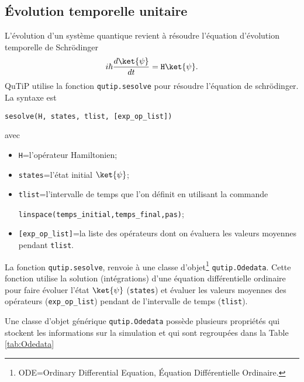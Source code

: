\subsection{Évolution temporelle unitaire}

L'évolution d'un système quantique revient à résoudre l'équation d'évolution 
temporelle de Schr\"odinger
\begin{equation}
i\hbar\dfrac{d\ket{\psi}}{dt}=\texttt{H}\ket{\psi}.
\end{equation}
QuTiP utilise la fonction \texttt{qutip.sesolve} pour résoudre l'équation de 
schr\"odinger. La syntaxe est
\begin{center}
 \texttt{sesolve(H, states, tlist, [exp\_op\_list])}
\end{center}
avec
\begin{itemize}
\item \texttt{H}=l'opérateur Hamiltonien;
\item \texttt{states}=l'état initial $\ket{\psi}$;
\item \texttt{tlist}=l'intervalle de temps que l'on définit en utilisant la
commande 
\begin{center}
\texttt{linspace(temps\_initial,temps\_final,pas)};
\end{center}
\item \texttt{[exp\_op\_list]}=la liste des opérateurs dont on évaluera les 
valeurs moyennes pendant \texttt{tlist}.
\end{itemize}

La fonction \texttt{qutip.sesolve}, renvoie à une classe 
d'objet\footnote{ODE=Ordinary Differential Equation, Équation Différentielle 
Ordinaire.} \texttt{qutip.Odedata}. Cette fonction utilise la solution 
(intégrations) d'une équation différentielle ordinaire pour faire évoluer 
l'état $\ket{\psi}$ (\texttt{states}) et évaluer les valeurs moyennes 
des opérateurs (\texttt{exp\_op\_list}) pendant de l'intervalle de temps 
(\texttt{tlist}).

Une classe d'objet générique \texttt{qutip.Odedata} possède plusieurs propriétés 
qui stockent les informations sur la simulation et qui sont regroupées dans la 
Table \ref{tab:Odedata}

